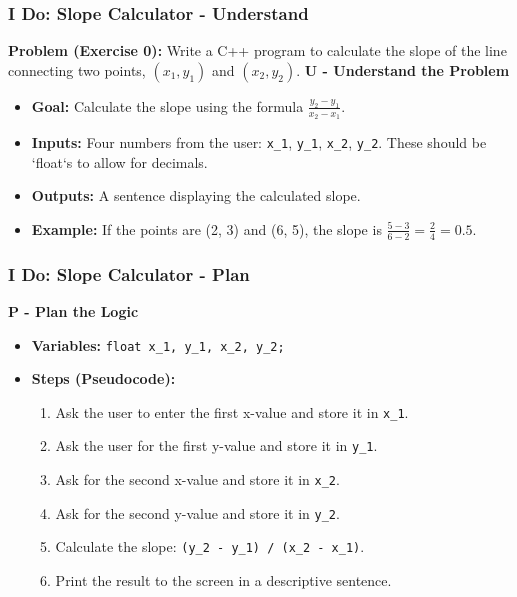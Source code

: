 \documentclass{beamer}
\begin{document}
\begin{frame}
\frametitle{I Do: Slope Calculator - Understand}
\textbf{Problem (Exercise 0):} Write a C++ program to calculate the slope of the line connecting two points, $(x_1, y_1)$ and $(x_2, y_2)$.
\vfill
\textbf{U - Understand the Problem}
\begin{itemize}
    \item \textbf{Goal:} Calculate the slope using the formula $\frac{y_2 - y_1}{x_2 - x_1}$.
    \item \textbf{Inputs:} Four numbers from the user: \texttt{x\_1}, \texttt{y\_1}, \texttt{x\_2}, \texttt{y\_2}. These should be `float`s to allow for decimals.
    \item \textbf{Outputs:} A sentence displaying the calculated slope.
    \item \textbf{Example:} If the points are (2, 3) and (6, 5), the slope is $\frac{5 - 3}{6 - 2} = \frac{2}{4} = 0.5$.
\end{itemize}
\end{frame}

\begin{frame}
\frametitle{I Do: Slope Calculator - Plan}
\textbf{P - Plan the Logic}
\begin{itemize}
    \item \textbf{Variables:}
    \texttt{float x\_1, y\_1, x\_2, y\_2;}
    \item \textbf{Steps (Pseudocode):}
    \begin{enumerate}
        \item Ask the user to enter the first x-value and store it in \texttt{x\_1}.
        \item Ask the user for the first y-value and store it in \texttt{y\_1}.
        \item Ask for the second x-value and store it in \texttt{x\_2}.
        \item Ask for the second y-value and store it in \texttt{y\_2}.
        \item Calculate the slope: \texttt{(y\_2 - y\_1) / (x\_2 - x\_1)}.
        \item Print the result to the screen in a descriptive sentence.
    \end{enumerate}
\end{itemize}
\end{frame}
\end{document}

